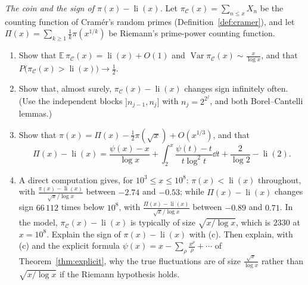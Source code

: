 \begin{exercise}[$\star\star\star$]\label{pb:cramersign}
\emph{The coin and the sign of $\pi(x)-\operatorname{li}(x)$.} Let $\pi_{\mathcal C}(x)=\sum_{n\le x}X_n$ be the counting function of Cramér's random primes
(Definition~\ref{def:cramer}), and let $\Pi(x)=\sum_{k\ge1}\frac1k\pi(x^{1/k})$ be Riemann's prime-power counting function.
\begin{enumerate}[label=(\alph*)]
\item Show that $\mathbb E\,\pi_{\mathcal C}(x)=\operatorname{li}(x)+O(1)$ and $\operatorname{Var}\pi_{\mathcal C}(x)\sim\frac x{\log x}$, and that
$P\bigl(\pi_{\mathcal C}(x)>\operatorname{li}(x)\bigr)\to\frac12$.
\item Show that, almost surely, $\pi_{\mathcal C}(x)-\operatorname{li}(x)$ changes sign infinitely often. (Use the independent blocks $]n_{j-1},n_j]$ with $n_j=2^{2^j}$, and
both Borel--Cantelli lemmas.)
\item Show that $\pi(x)=\Pi(x)-\frac12\pi(\sqrt x)+O(x^{1/3})$, and that
\[
\Pi(x)-\operatorname{li}(x)=\frac{\psi(x)-x}{\log x}+\int_2^x\frac{\psi(t)-t}{t\log^2t}\dd t+\frac2{\log2}-\operatorname{li}(2).
\]
\item A direct computation gives, for $10^3\le x\le10^8$: $\pi(x)<\operatorname{li}(x)$ throughout, with $\frac{\pi(x)-\operatorname{li}(x)}{\sqrt x/\log x}$ between $-2.74$ and
$-0.53$; while $\Pi(x)-\operatorname{li}(x)$ changes sign $66\,112$ times below $10^8$, with $\frac{\Pi(x)-\operatorname{li}(x)}{\sqrt x/\log x}$ between $-0.89$ and $0.71$. In the
model, $\pi_{\mathcal C}(x)-\operatorname{li}(x)$ is typically of size $\sqrt{x/\log x}$, which is $2330$ at $x=10^8$. Explain the sign of $\pi(x)-\operatorname{li}(x)$
with (c). Then explain, with (c) and the explicit formula $\psi(x)=x-\sum_\rho\frac{x^\rho}\rho+\cdots$ of Theorem~\ref{thm:explicit}, why the true fluctuations are of
size $\frac{\sqrt x}{\log x}$ rather than $\sqrt{x/\log x}$ if the Riemann hypothesis holds.
\end{enumerate}
\end{exercise}

